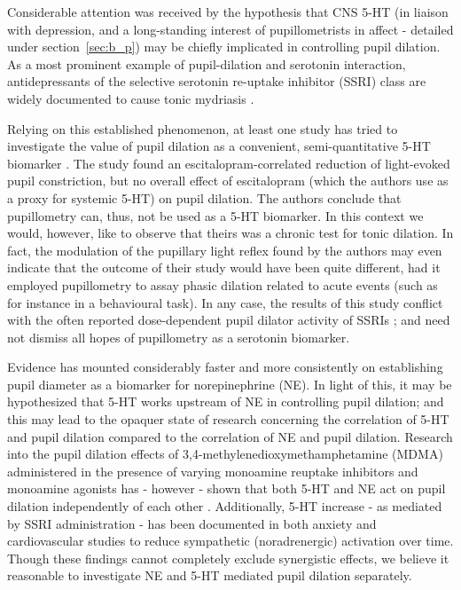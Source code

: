 	Considerable attention was received by the hypothesis that CNS 5-HT (in liaison with depression, and a long-standing interest of pupillometrists in affect - detailed under section~\ref{sec:b_p}) may be chiefly implicated in controlling pupil dilation.
	As a most prominent example of pupil-dilation and serotonin interaction, antidepressants of the selective serotonin re-uptake inhibitor (SSRI) class are widely documented to cause tonic mydriasis \cite{Fitzgerald2013,Klein-Schwartz2012}.
	
	Relying on this established phenomenon, at least one study has tried to investigate the value of pupil dilation as a convenient, semi-quantitative 5-HT biomarker \cite{Noehr-Jensen2009}.
	The study found an escitalopram-correlated reduction of light-evoked pupil constriction, but no overall effect of escitalopram (which the authors use as a proxy for systemic 5-HT) on pupil dilation.
	The authors conclude that pupillometry can, thus, not be used as a 5-HT biomarker.
	In this context we would, however, like to observe that theirs was a chronic test for tonic dilation.
	In fact, the modulation of the pupillary light reflex found by the authors may even indicate that the outcome of their study would have been quite different, had it employed pupillometry to assay phasic dilation related to acute events (such as for instance in a behavioural task).
	In any case, the results of this study conflict with the often reported dose-dependent pupil dilator activity of SSRIs \cite{Nielsen2010,Fitzgerald2013,Klein-Schwartz2012};
	and need not dismiss all hopes of pupillometry as a serotonin biomarker.
	
	Evidence has mounted considerably faster and more consistently on establishing pupil diameter as a biomarker for norepinephrine (NE).
	In light of this, it may be hypothesized that 5-HT works upstream of NE in controlling pupil dilation; and this may lead to the opaquer state of research concerning the correlation of 5-HT and pupil dilation compared to the correlation of NE and pupil dilation.
	Research into the pupil dilation effects of 3,4-methylenedioxymethamphetamine (MDMA) administered in the presence of varying monoamine reuptake inhibitors and monoamine agonists has - however - shown that both 5-HT and NE act on pupil dilation independently of each other \cite{Hysek2012}.
	Additionally, 5-HT increase - as mediated by SSRI administration - has been documented in both anxiety \cite{Blier2007} and cardiovascular \cite{Barton2007} studies to reduce sympathetic (noradrenergic) activation over time. 
	Though these findings cannot completely exclude synergistic effects, we believe it reasonable to investigate NE and 5-HT mediated pupil dilation separately.
	
